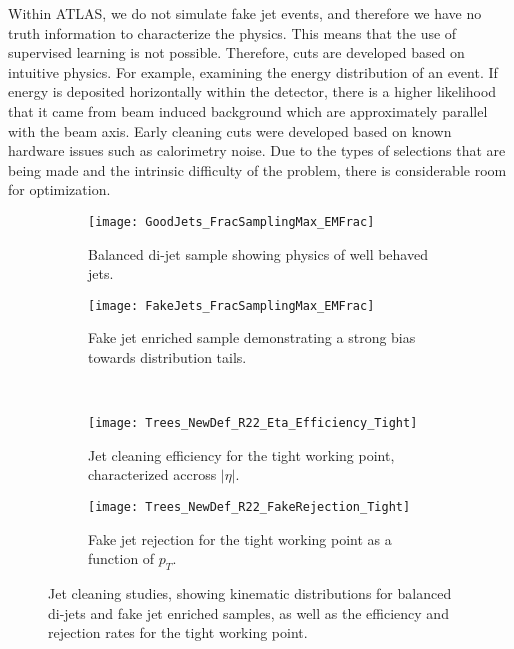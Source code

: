 \documentclass[12pt]{article}
\begin{document}
Within ATLAS, we do not simulate fake jet events, and therefore we have no truth
information to characterize the physics. This means that the use of supervised
learning is not possible. Therefore, cuts are developed based on intuitive
physics. For example, examining the energy distribution of an event. If energy
is deposited horizontally within the detector, there is a higher likelihood that
it came from beam induced background which are approximately parallel with the
beam axis. Early cleaning cuts were developed based on known hardware issues
such as calorimetry noise. Due to the types of selections that are being made
and the intrinsic difficulty of the problem, there is considerable room for
optimization. 

\begin{figure}[t!]
    \centering
    \begin{subfigure}[t]{.48\textwidth}
        \centering
        \texttt{[image: GoodJets\_FracSamplingMax\_EMFrac]}
        \caption{Balanced di-jet sample showing physics of well behaved jets.}
        \label{subfig:good_jets_th2}
    \end{subfigure}
    \hfill
    \begin{subfigure}[t]{.48\textwidth}
        \centering
        \texttt{[image: FakeJets\_FracSamplingMax\_EMFrac]}
        \caption{Fake jet enriched sample demonstrating a strong bias towards
        distribution tails.}
        \label{subfig:fake_jets_th2}
    \end{subfigure} %
    ~
    \begin{subfigure}[t]{.48\textwidth}
        \centering
        \texttt{[image: Trees\_NewDef\_R22\_Eta\_Efficiency\_Tight]}
        \caption{Jet cleaning efficiency for the tight working point,
        characterized accross $|\eta|$.}
        \label{subfig:cleaning_perf_eff_eta_tight}
    \end{subfigure}
    \hfill
    \begin{subfigure}[t]{.48\textwidth}
        \centering
        \texttt{[image: Trees\_NewDef\_R22\_FakeRejection\_Tight]}
        \caption{Fake jet rejection for the tight working point as a function of
        $p_T$.}
        \label{subfig:cleaning_perf_rejection_tight}
    \end{subfigure}
\caption{Jet cleaning studies, showing kinematic distributions for balanced
di-jets and fake jet enriched samples, as well as the efficiency and rejection
rates for the tight working point.}
\label{fig:jet_cleaning}
\end{figure}
\end{document}
